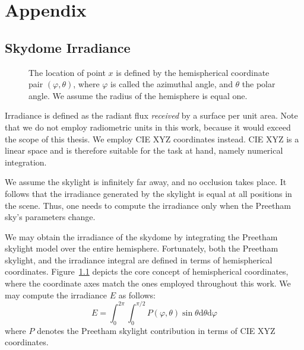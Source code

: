\chapter{Appendix}
\section{Skydome Irradiance}
%
\begin{figure}
\centering
\def\svgwidth{0.5\textwidth}

\caption{The location of point $x$ is defined by the hemispherical coordinate
pair $(\varphi, \theta)$, where $\varphi$ is called the azimuthal angle, and
$\theta$ the polar angle. We assume the radius of the hemisphere
is equal one.}
\label{fig:hemispherical:coordinates}
\end{figure}
%
Irradiance is defined as the radiant flux \emph{received} by a surface per unit
area. Note that we do not employ radiometric units in this work, because it
would exceed the scope of this thesis. We employ CIE XYZ \citep{ciexyz:1931}
coordinates instead.
CIE XYZ is a linear space and is therefore suitable for the task at hand,
namely numerical integration.

We assume the skylight is infinitely far away, and no occlusion takes place.
It follows that the irradiance generated by the skylight is equal at all
positions in the scene.
Thus, one needs to compute the irradiance only when the Preetham sky's
parameters change.

We may obtain the irradiance of the skydome by integrating the
Preetham skylight model over the entire hemisphere. Fortunately, both the
Preetham skylight, and the irradiance integral are defined in terms of
hemispherical coordinates. Figure~\ref{fig:hemispherical:coordinates} depicts
the core concept of hemispherical coordinates, where the coordinate axes match
the ones employed throughout this work. We may compute the irradiance $E$ as
follows:
\begin{equation}
E = \int_{0}^{2\pi}\int_{0}^{\pi/2} P(\varphi,\theta) \sin{\theta}\mathrm{d}\theta\mathrm{d}\varphi
\end{equation}
where $P$ denotes the Preetham skylight contribution in terms of CIE XYZ coordinates.

%
%
